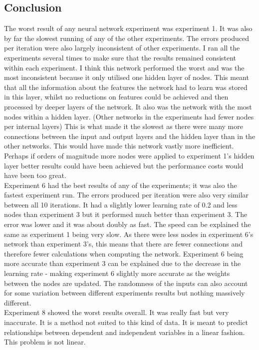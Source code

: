 \documentclass[11pt]{article}
\begin{document}
\begin{page}
\section{Conclusion}
The worst result of any neural network experiment was experiment 1. It was also by far the slowest running of any of the other experiments. The errors produced per iteration were also largely inconsistent of other experiments. I ran all the experiments several times to make sure that the results remained consistent within each experiment. I think this network performed the worst and was the most inconsistent because it only utilised one hidden layer of nodes. This meant that all the information about the features the network had to learn was stored in this layer, whilst no reductions on features could be achieved and then processed by deeper layers of the network. It also was the network with the most nodes within a hidden layer. (Other networks in the experiments had fewer nodes per internal layers) This is what made it the slowest as there were many more connections between the input and output layers and the hidden layer than in the other networks. This would have made this network vastly more inefficient. Perhaps if orders of magnitude more nodes were applied to experiment 1's hidden layer better results could have been achieved but the performance costs would have been too great. \\

\noindent Experiment 6 had the best results of any of the experiments; it was also the fastest experiment run. The errors produced per iteration were also very similar between all 10 iterations. It had a slightly lower learning rate of 0.2 and less nodes than experiment 3 but it performed much better than experiment 3. The error was lower and it was about doubly as fast. The speed can be explained the same as experiment 1 being very slow. As there were less nodes in experiment 6’s network than experiment 3’s, this means that there are fewer connections and therefore fewer calculations when computing the network. Experiment 6 being more accurate than experiment 3 can be explained due to the decrease in the learning rate - making experiment 6 slightly more accurate as the weights between the nodes are updated. The randomness of the inputs can also account for some variation between different experiments results but nothing massively different.\\

\noindent Experiment 8 showed the worst results overall. It was really fast but very inaccurate. It is a method not suited to this kind of data. It is meant to predict relationships between dependent and independent variables in a linear fashion. This problem is not linear.


\end{page}
\end{document}
